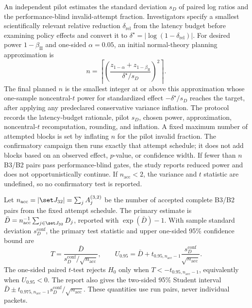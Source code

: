An independent pilot estimates the standard deviation $s_D$ of paired log ratios and the performance-blind invalid-attempt fraction. Investigators specify a smallest scientifically relevant relative reduction $\delta_{\mathrm{rel}}$ from the latency budget before examining policy effects and convert it to $\delta^\star=|\log(1-\delta_{\mathrm{rel}})|$. For desired power $1-\beta_{\mathrm{II}}$ and one-sided $\alpha=0.05$, an initial normal-theory planning approximation is
\begin{equation}
 n=\left\lceil
 \left(\frac{z_{1-\alpha}+z_{1-\beta_{\mathrm{II}}}}{\delta^\star/s_D}\right)^2
 \right\rceil.
 \label{eq:power}
\end{equation}
The final planned $n$ is the smallest integer at or above this approximation whose one-sample noncentral-$t$ power for standardized effect $-\delta^\star/s_D$ reaches the target, after applying any predeclared conservative variance inflation. The protocol records the latency-budget rationale, pilot $s_D$, chosen power, approximation, noncentral-$t$ recomputation, rounding, and inflation. A fixed maximum number of attempted blocks is set by inflating $n$ for the pilot invalid fraction. The confirmatory campaign then runs exactly that attempt schedule; it does not add blocks based on an observed effect, $p$-value, or confidence width. If fewer than $n$ B3/B2 pairs pass performance-blind gates, the study reports reduced power and does not opportunistically continue. If $n_{\mathrm{acc}}<2$, the variance and $t$ statistic are undefined, so no confirmatory test is reported.

Let $n_{\mathrm{acc}}=|\set J_{32}|=\sum_j A_j^{(3,2)}$ be the number of accepted complete B3/B2 pairs from the fixed attempt schedule. The primary estimate is $\bar D=n_{\mathrm{acc}}^{-1}\sum_{j\in\set J_{32}}D_j$, reported with $\exp(\bar D)-1$. With sample standard deviation $s_D^{\mathrm{conf}}$, the primary test statistic and upper one-sided 95\% confidence bound are
\begin{equation}
 T=\frac{\bar D}{s_D^{\mathrm{conf}}/\sqrt{n_{\mathrm{acc}}}},\qquad
 U_{0.95}=\bar D+t_{0.95,n_{\mathrm{acc}}-1}
 \frac{s_D^{\mathrm{conf}}}{\sqrt{n_{\mathrm{acc}}}}.
 \label{eq:primary-ci}
\end{equation}
The one-sided paired $t$-test rejects $H_0$ only when $T<-t_{0.95,n_{\mathrm{acc}}-1}$, equivalently when $U_{0.95}<0$. The report also gives the two-sided 95\% Student interval $\bar D\pm t_{0.975,n_{\mathrm{acc}}-1}s_D^{\mathrm{conf}}/\sqrt{n_{\mathrm{acc}}}$. These quantities use run pairs, never individual packets.

